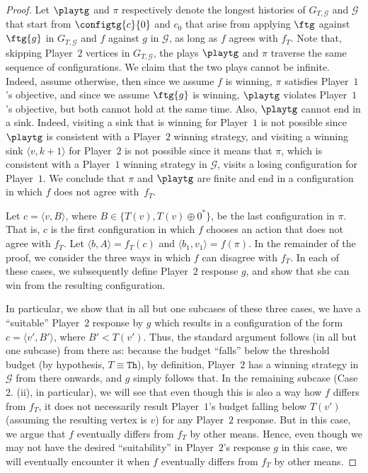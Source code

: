 \documentclass{article}\providecommand{\nequiv}{\not\equiv}\usepackage[a4paper,margin=20mm]{geometry}
\newcommand{\PO}{Player~$1$\xspace}
\newcommand{\PT}{Player~$2$\xspace}
\newcommand{\G}{{\mathcal G}}
\newcommand{\thresh}{\texttt{Th}\xspace}
\newcommand{\zug}[1]{\langle #1  \rangle}
\newcommand{\succb}[1]{#1 \oplus 0^*\xspace}
\begin{document}
\begin{proof}
Let $\playtg$ and $\pi$ respectively denote the longest histories of $G_{T, \G}$ and $\G$ that start from $\configtg{c}{0}$ and \(c_0\) that arise from applying $\ftg$ against \(\ftg{g}\) in \(G_{T, \G}\) and \(f\) against \(g\) in \(\G\), as long as $f$ agrees with $f_T$. Note that, skipping \PT vertices in $G_{T,\G}$, the plays $\playtg$ and $\pi$ traverse the same sequence of configurations. We claim that the two plays cannot be infinite. Indeed, assume otherwise, then since we assume $f$ is winning, $\pi$ satisfies \PO's objective, and since we assume $\ftg{g}$ is winning, $\playtg$ violates \PO's objective, but both cannot hold at the same time. 
Also, $\playtg$ cannot end in a sink. Indeed, visiting a sink that is winning for \PO is not possible since $\playtg$ is consistent with a \PT winning strategy, and visiting a winning sink $\zug{v, k+1}$ for \PT is not possible since it means that $\pi$, which is consistent with a \PO winning strategy in $\G$, visits a losing configuration for \PO.   We conclude that $\pi$ and $\playtg$ are finite and end in a configuration in which \(f\) does not agree with~\(f_T\). 

Let $c = \zug{v, B}$, where \(B \in \{T(v), \succb{T(v)}\}\), be the last configuration in $\pi$. 
That is, $c$ is the first configuration in which $f$ chooses an action that does not agree with $f_T$. Let $\zug{b,A} = f_T(c)$ and $\zug{b_1, v_1} = f(\pi)$. 
In the remainder of the proof, we consider the three ways in which $f$ can disagree with $f_T$. 
In each of these cases, we subsequently define \PT response \(g\), and show that she can win from the resulting configuration. 

In particular, we show that in all but one subcases of these three cases, we have a ``suitable'' \PT response by \(g\) which results in a configuration of the form \(c = \zug{v', B'}\), where \(B' < T(v')\). 
Thus, the standard argument follows (in all but one subcase) from there as: because the budget ``falls'' below the threshold budget (by hypothesis, \(T \equiv \thresh\)), by definition, \PT has a winning strategy in \(\G\) from there onwards, and \(g\) simply follows that. 
In the remaining subcase (Case 2. (ii), in particular), we will see that even though this is also a way how \(f\) differs from \(f_T\), it does not necessarily result \PO's budget falling below \(T(v')\) (assuming the resulting vertex is \(v\)) for any \PT response. 
But in this case, we argue that \(f\) eventually differs from \(f_T\) by other means. 
Hence, even though we may not have the desired ``suitability'' in  \PT's response \(g\) in this case, we will eventually encounter it when \(f\) eventually differs from \(f_T\) by other means. 



\end{proof}
\end{document}
